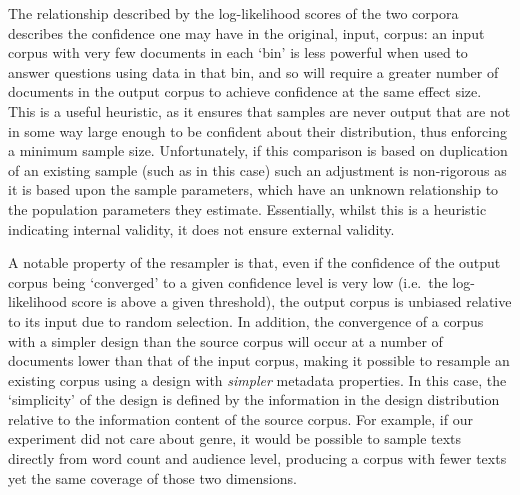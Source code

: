 













The relationship described by the log-likelihood scores of the two corpora describes the confidence one may have in the original, input, corpus: an input corpus with very few documents in each `bin' is less powerful when used to answer questions using data in that bin, and so will require a greater number of documents in the output corpus to achieve confidence at the same effect size.  This is a useful heuristic, as it ensures that samples are never output that are not in some way large enough to be confident about their distribution, thus enforcing a minimum sample size.  Unfortunately, if this comparison is based on duplication of an existing sample (such as in this case) such an adjustment is non-rigorous as it is based upon the sample parameters, which have an unknown relationship to the population parameters they estimate.  Essentially, whilst this is a heuristic indicating internal validity, it does not ensure external validity.

A notable property of the resampler is that, even if the confidence of the output corpus being `converged' to a given confidence level is very low (i.e.\ the log-likelihood score is above a given threshold), the output corpus is unbiased relative to its input due to random selection.  In addition, the convergence of a corpus with a simpler design than the source corpus will occur at a number of documents lower than that of the input corpus, making it possible to resample an existing corpus using a design with \textit{simpler} metadata properties.  In this case, the `simplicity' of the design is defined by the information in the design distribution relative to the information content of the source corpus.  For example, if our experiment did not care about genre, it would be possible to sample texts directly from word count and audience level, producing a corpus with fewer texts yet the same coverage of those two dimensions.






